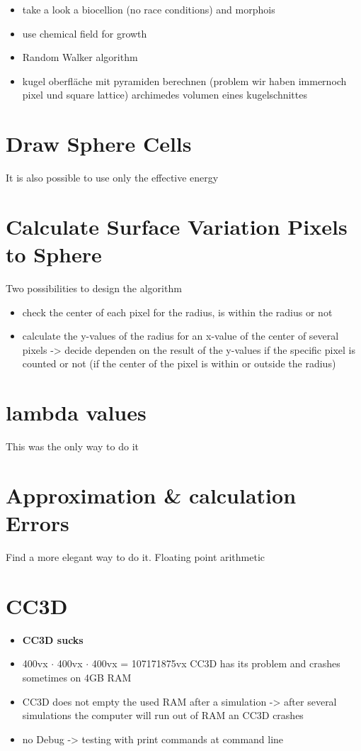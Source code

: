 \begin{itemize}
\item take a look a biocellion (no race conditions) and morphois
\item use chemical field for growth
\item Random Walker algorithm
\item kugel oberfläche mit pyramiden berechnen (problem wir haben immernoch pixel und square lattice)
\subitem archimedes volumen eines kugelschnittes
\end{itemize}

\section{Draw Sphere Cells}
It is also possible to use only the effective energy

\section{Calculate Surface Variation Pixels to Sphere}
Two possibilities to design the algorithm
\begin{itemize}
\item check the center of each pixel for the radius, is within the radius or not
\item calculate the y-values of the radius for an x-value of the center of several pixels -> decide dependen on the result of the y-values if the specific pixel is counted or not (if the center of the pixel is within or outside the radius)
\end{itemize}
\section{lambda values}
This was the only way to do it

\section{Approximation \& calculation Errors}
Find a more elegant way to do it. \newline
Floating point arithmetic

\section{CC3D}
\begin{itemize}
\item \textbf{CC3D sucks}
\item 400vx $\cdot$ 400vx $\cdot$ 400vx = 107171875vx CC3D has its problem and crashes sometimes on 4GB RAM
\item CC3D does not empty the used RAM after a simulation -> after several simulations the computer will run out of RAM an CC3D crashes
\item no Debug -> testing with print commands at command line
\end{itemize}